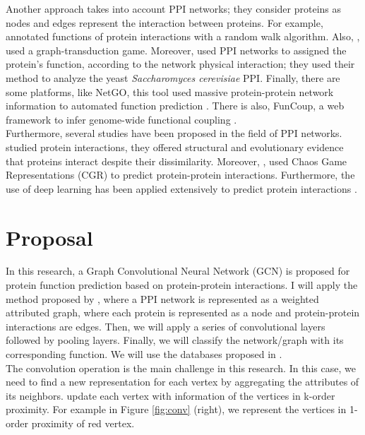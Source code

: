 \documentclass[a4paper]{article}
\begin{document}
Another approach takes into account PPI networks; they consider proteins as nodes and edges represent the interaction between proteins. For example, \cite{freschi2007protein} annotated functions of protein interactions with a random walk algorithm. Also, \cite{vascon2020protein}, used a graph-transduction game. Moreover, \cite{vazquez2003global} used PPI networks to assigned the protein's function, according to the network physical interaction; they used their method to analyze the yeast \textit{Saccharomyces cerevisiae} PPI. Finally, there are some platforms, like NetGO, this tool used massive protein-protein network information to automated function prediction \citep{you2019netgo}. There is also, FunCoup, a web framework to infer genome-wide functional coupling \citep{ogris2018funcoup}.\\

Furthermore, several studies have been proposed in the field of PPI networks.  \cite{kovacs2019network} studied protein interactions, they offered structural and evolutionary evidence that proteins interact despite their dissimilarity. Moreover, \cite{jia2019ippi}, used Chaos Game Representations (CGR) to predict protein-protein interactions. Furthermore, the use of deep learning has been applied extensively to predict protein interactions \cite{wang2019predicting, zhang2019protein, zeng2020protein}.\\


\section{Proposal}\label{proposal}

In this research, a Graph Convolutional Neural Network (GCN)  is proposed for protein function prediction based on protein-protein interactions. I will apply the method proposed by \cite{Susha2019}, where a PPI network is represented as a weighted attributed graph, where each protein is represented as a node and protein-protein interactions are edges. Then, we will apply a series of convolutional layers followed by pooling layers. Finally, we will classify the network/graph with its corresponding function. We will use the databases proposed in \cite{you2019netgo}. \\

The convolution operation is the main challenge in this research. In this case, we need to find a new representation for each vertex by aggregating the attributes of its neighbors. \cite{Susha2019} update each vertex with information of the vertices in k-order proximity. For example in Figure \ref{fig:conv} (right), we represent the vertices in 1-order proximity of red vertex. 
\end{document}
